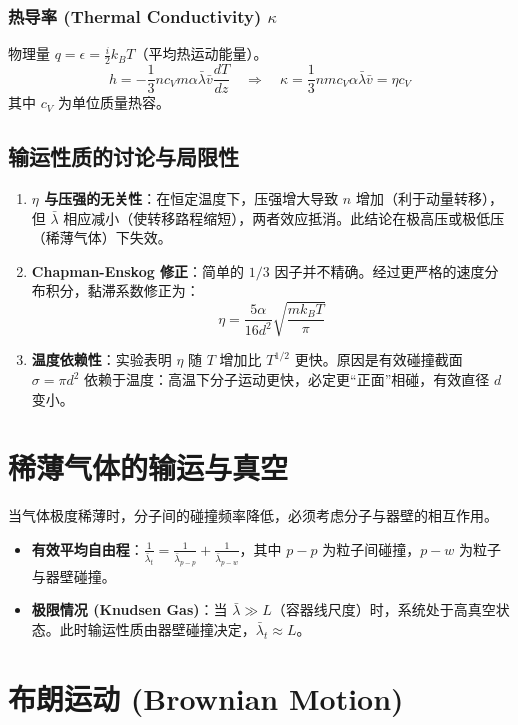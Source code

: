 \documentclass{article}
\begin{document}
\subsubsection{热导率 (Thermal Conductivity) $\kappa$}
物理量 $q = \epsilon = \frac{i}{2} k_B T$（平均热运动能量）。
\[ h = - \frac{1}{3} n c_V m \alpha \bar{\lambda} \bar{v} \frac{dT}{dz} \quad \Rightarrow \quad \kappa = \frac{1}{3} n m c_V \alpha \bar{\lambda} \bar{v} = \eta c_V \]
其中 $c_V$ 为单位质量热容。

\subsection{输运性质的讨论与局限性}
\begin{enumerate}
    \item \textbf{$\eta$ 与压强的无关性}：在恒定温度下，压强增大导致 $n$ 增加（利于动量转移），但 $\bar{\lambda}$ 相应减小（使转移路程缩短），两者效应抵消。此结论在极高压或极低压（稀薄气体）下失效。
    \item \textbf{Chapman-Enskog 修正}：简单的 $1/3$ 因子并不精确。经过更严格的速度分布积分，黏滞系数修正为：
    \[ \eta = \frac{5\alpha}{16 d^2} \sqrt{\frac{m k_B T}{\pi}} \]
    \item \textbf{温度依赖性}：实验表明 $\eta$ 随 $T$ 增加比 $T^{1/2}$ 更快。原因是有效碰撞截面 $\sigma = \pi d^2$ 依赖于温度：高温下分子运动更快，必定更“正面”相碰，有效直径 $d$ 变小。
\end{enumerate}

\section{稀薄气体的输运与真空}
当气体极度稀薄时，分子间的碰撞频率降低，必须考虑分子与器壁的相互作用。
\begin{itemize}
    \item \textbf{有效平均自由程}：$\frac{1}{\bar{\lambda}_t} = \frac{1}{\bar{\lambda}_{p-p}} + \frac{1}{\bar{\lambda}_{p-w}}$，其中 $p-p$ 为粒子间碰撞，$p-w$ 为粒子与器壁碰撞。
    \item \textbf{极限情况 (Knudsen Gas)}：当 $\bar{\lambda} \gg L$（容器线尺度）时，系统处于高真空状态。此时输运性质由器壁碰撞决定，$\bar{\lambda}_t \approx L$。
\end{itemize}

\section{布朗运动 (Brownian Motion)}
\end{document}

